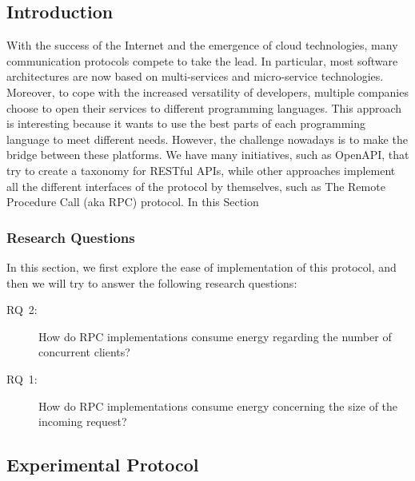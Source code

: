 \subsection{Introduction}
With the success of the Internet and the emergence of cloud technologies, many communication protocols compete to take the lead.
In particular, most software architectures are now based on multi-services and micro-service technologies.
Moreover, to cope with the increased versatility of developers, multiple companies choose to open their services to different programming languages.
This approach is interesting because it wants to use the best parts of each programming language to meet different needs.
However, the challenge nowadays is to make the bridge between these platforms.
We have many initiatives, such as OpenAPI, that try to create a taxonomy for RESTful APIs, while other approaches implement all the different interfaces of the protocol by themselves, such as The Remote Procedure Call (aka RPC) protocol.
In this Section

\subsubsection{Research Questions}
In this section, we first explore the ease of implementation of this protocol, and then we will try to answer the following research questions:
\begin{description}
    \item[\textsc{RQ}~2:] How do RPC implementations consume energy regarding the number of concurrent clients?
    \item[\textsc{RQ}~1:] How do RPC implementations consume energy concerning the size of the incoming request?
\end{description}

\subsection{Experimental Protocol}

